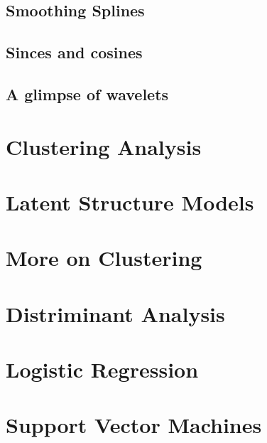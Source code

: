 \documentclass[
]{book}
\begin{document}
\hypertarget{smoothing-splines}{%
\section{Smoothing Splines}\label{smoothing-splines}}

\hypertarget{sinces-and-cosines}{%
\section{Sinces and cosines}\label{sinces-and-cosines}}

\hypertarget{a-glimpse-of-wavelets}{%
\section{A glimpse of wavelets}\label{a-glimpse-of-wavelets}}

\hypertarget{clustering-analysis}{%
\chapter{Clustering Analysis}\label{clustering-analysis}}

\hypertarget{latent-structure-models}{%
\chapter{Latent Structure Models}\label{latent-structure-models}}

\hypertarget{more-on-clustering}{%
\chapter{More on Clustering}\label{more-on-clustering}}

\hypertarget{distriminant-analysis}{%
\chapter{Distriminant Analysis}\label{distriminant-analysis}}

\hypertarget{logistic-regression}{%
\chapter{Logistic Regression}\label{logistic-regression}}

\hypertarget{support-vector-machines}{%
\chapter{Support Vector Machines}\label{support-vector-machines}}
\end{document}
